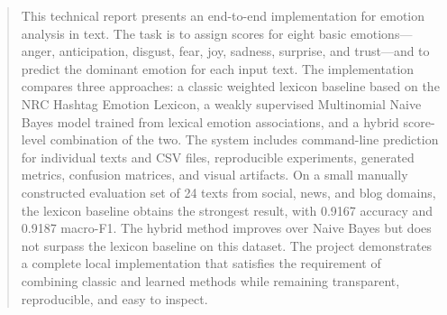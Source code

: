 \begin{abstract}
This technical report presents an end-to-end implementation for emotion analysis in text. The task is to assign scores for eight basic emotions---anger, anticipation, disgust, fear, joy, sadness, surprise, and trust---and to predict the dominant emotion for each input text. The implementation compares three approaches: a classic weighted lexicon baseline based on the NRC Hashtag Emotion Lexicon, a weakly supervised Multinomial Naive Bayes model trained from lexical emotion associations, and a hybrid score-level combination of the two. The system includes command-line prediction for individual texts and CSV files, reproducible experiments, generated metrics, confusion matrices, and visual artifacts. On a small manually constructed evaluation set of 24 texts from social, news, and blog domains, the lexicon baseline obtains the strongest result, with 0.9167 accuracy and 0.9187 macro-F1. The hybrid method improves over Naive Bayes but does not surpass the lexicon baseline on this dataset. The project demonstrates a complete local implementation that satisfies the requirement of combining classic and learned methods while remaining transparent, reproducible, and easy to inspect.
\end{abstract}
